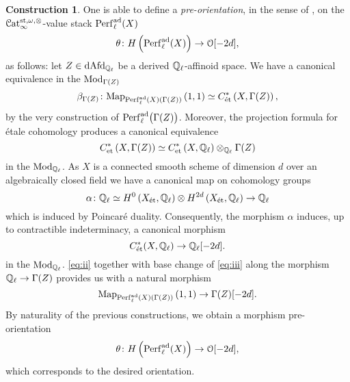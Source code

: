 \documentclass[10pt,a4paper]{amsart}
\numberwithin{equation}{subsection}
\theoremstyle{plain}
\theoremstyle{definition}
\newtheorem{construction}[theorem]{Construction}
\theoremstyle{remark}
\numberwithin{equation}{section}
\begin{document}
\begin{construction} \label{const:pair}
One is able to define a \emph{pre-orientation}, in the sense of \cite[Definition 3.3]{toen_ss}, on the $\mathcal{C}\mathrm{at}^{\mathrm{st}, \omega, \otimes}_{\infty}$-value stack $\mathrm{Perf}^{\mathrm{ad}}_\ell(X)$
	\[
		\theta \colon H \left( \mathrm{Perf}^{\mathrm{ad}}_{\ell}(X)\right) \to \mathcal{O}[-2d],
	\]
as follows: let $Z \in \mathrm{dAfd}_{\mathbb{Q}_\ell}$ be a derived $\mathbb{Q}_\ell$-affinoid space. We have a canonical equivalence in the \infcat $\mathrm{Mod}_{\Gamma(Z)}$
	\begin{equation} \label{eq:ii}
		 \beta_{\Gamma(Z)} \colon \mathrm{Map}_{\mathrm{Perf}^{\mathrm{ad}}_\ell(X)(\Gamma(Z))} \left( 1, 1 \right) \simeq C^*_{\text{\text{\'et}}} \left( X, \Gamma(Z) \right),
	\end{equation}
by the very construction of $\mathrm{Perf}^{\mathrm{ad}}_\ell \big( \Gamma(Z) \big)$. Moreover, the projection formula for \'etale cohomology produces a canonical equivalence
	\[
		C^*_{\text{et}} \left( X, \Gamma(Z) \right) \simeq C^*_{\text{et}} \left( X, \mathbb{Q}_\ell \right) \otimes_{\mathbb{Q}_\ell} \Gamma(Z)
	\]
in the \infcat $\mathrm{Mod}_{\mathbb{Q}_\ell}$. As $X$ is a connected smooth scheme of dimension $d$ over an algebraically closed field we have a canonical map on cohomology groups
	\[
		\alpha \colon \mathbb{Q}_\ell \simeq H^0 \left( X_{\text{\'et}}, \mathbb{Q}_\ell \right) \otimes H^{2d} \left( X_{\text{\'et}}, \mathbb{Q}_\ell \right) \to \mathbb{Q}_\ell 
	\]
which is induced by Poincar\'e duality. Consequently, the morphism $\alpha$ induces, up to contractible indeterminacy, a canonical morphism
	\begin{equation} \label{eq:iii}
		C^*_{\text{\'et}}(X, \mathbb{Q}_\ell) \to \mathbb{Q}_\ell [-2d].
	\end{equation}
in the \infcat $\mathrm{Mod}_{\mathbb Q_\ell}$.
\eqref{eq:ii} together with base change of \eqref{eq:iii} along the morphism $\mathbb{Q}_\ell \to \Gamma(Z) $ provides us with a natural morphism
	\[
	 	\mathrm{Map}_{\mathrm{Perf}^{\mathrm{ad}}_\ell(X) (\Gamma(Z)) } \left( 1, 1 \right) \to \Gamma(Z) [-2d].
	\]
By naturality of the previous constructions, we obtain a morphism pre-orientation
	\[
		\theta \colon H \left( \mathrm{Perf}^{\mathrm{ad}}_\ell(X) \right) \to \mathcal{O}[-2d],
	\]
which corresponds to the desired orientation.


\end{construction}
\end{document}
